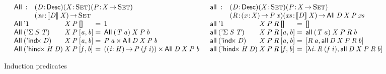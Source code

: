\begin{figure*}

\[
\begin{array}{ll}
\stk{
\begin{array}{@{}ll}
\All{\!}{\!}{\!}{\!} : & \PITEL{\V{D}}{\Desc}
                         \PITEL{\V{X}}{\Set}
                         \PITEL{\V{P}}{\V{X} \To \Set} \\
                       & \PI{\V{xs}}{\descop{\V{D}}{\V{X}}} 
                         \Set 
\end{array} \\
\begin{array}{@{}l@{}l@{\:=\:\:}l}
\All{\DUnit}{& \V{X}}{\V{P}}{\Void} &
    \Unit \\
\All{(\DSigma{\V{S}}{\V{T}})}{& \V{X}}{\V{P}}{\pair{\V{a}}{\V{b}}{}} &
    \All{(\V{T}\: \V{a})}{\V{X}}{\V{P}}{\V{b}} \\
\All{(\DIndx{\V{D}})}{& \V{X}}{\V{P}}{\pair{\V{a}}{\V{b}}{}} &
    \TIMES{\V{P}\: \V{a}}{\All{\V{D}}{\V{X}}{\V{P}}{\V{b}}} \\
\All{(\DHindx{\V{H}}{\V{D}})}{& \V{X}}{\V{P}}{\pair{\V{f}}{\V{b}}{}} &
    \TIMES{(\PI{\V{i}}{\V{H}} \V{P}\: (\V{f}\: \V{i}))}
          {\All{\V{D}}{\V{X}}{\V{P}}{\V{b}}}
\end{array}
}
&
\stk{
\begin{array}{@{}ll}
\all{\!}{\!}{\!}{\!}{\!} : & \PITEL{\V{D}}{\Desc}
                             \PITEL{\V{X}}{\Set}
                             \PITEL{\V{P}}{\V{X} \To \Set} \\
                           & \PITEL{\V{R}}{\PI{\V{x}}{\V{X}} \V{P}\: \V{x}}
                             \PI{\V{xs}}{\descop{\V{D}}{\V{X}}} 
                             \All{\V{D}}{\V{X}}{\V{P}}{\V{xs}} 
\end{array} \\
\begin{array}{@{}l@{}l@{\:=\:\:}l}
\all{\DUnit}{& \V{X}}{\V{P}}{\V{R}}{\Void} &
    \Void \\
\all{(\DSigma{\V{S}}{\V{T}})}{& \V{X}}{\V{P}}{\V{R}}{\pair{\V{a}}{\V{b}}{}} &
    \all{(\V{T}\: \V{a})}{\V{X}}{\V{P}}{\V{R}}{\V{b}} \\
\all{(\DIndx{\V{D}})}{& \V{X}}{\V{P}}{\V{R}}{\pair{\V{a}}{\V{b}}{}} &
    \pair{\V{R}\: \V{a}}
         {\all{\V{D}}{\V{X}}{\V{P}}{\V{R}}{\V{b}}}{} \\
\all{(\DHindx{\V{H}}{\V{D}})}{& \V{X}}{\V{P}}{\V{R}}{\pair{\V{f}}{\V{b}}{}} &
    \pair{\LAM{\V{i}} \V{R}\: (\V{f}\: \V{i})}
         {\all{\V{D}}{\V{X}}{\V{P}}{\V{R}}{\V{b}}}{}
\end{array}
\end{array}
}
\]

\caption{Induction predicates}
\label{fig:all-predicates}

\end{figure*}


